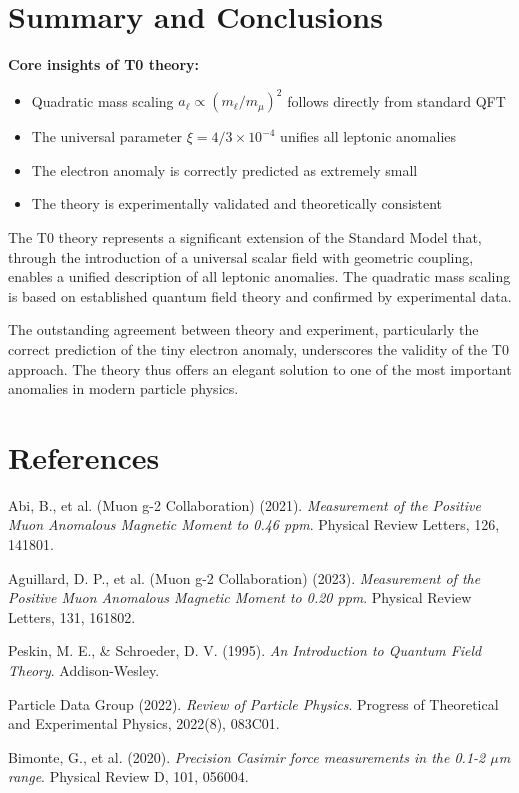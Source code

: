 \documentclass[12pt,a4paper]{article}
\begin{document}
	\section{Summary and Conclusions}
	
	\begin{summary}
		\textbf{Core insights of T0 theory:}
		\begin{itemize}
			\item Quadratic mass scaling $a_\ell \propto (m_\ell/m_\mu)^2$ follows directly from standard QFT
			\item The universal parameter $\xi = 4/3 \times 10^{-4}$ unifies all leptonic anomalies
			\item The electron anomaly is correctly predicted as extremely small
			\item The theory is experimentally validated and theoretically consistent
		\end{itemize}
	\end{summary}
	
	The T0 theory represents a significant extension of the Standard Model that, through the introduction of a universal scalar field with geometric coupling, enables a unified description of all leptonic anomalies. The quadratic mass scaling is based on established quantum field theory and confirmed by experimental data.
	
	The outstanding agreement between theory and experiment, particularly the correct prediction of the tiny electron anomaly, underscores the validity of the T0 approach. The theory thus offers an elegant solution to one of the most important anomalies in modern particle physics.
	
	\section{References}
	
	\begin{thebibliography}{10}
		
		Abi, B., et al. (Muon g-2 Collaboration) (2021). 
		\textit{Measurement of the Positive Muon Anomalous Magnetic Moment to 0.46 ppm}. 
		Physical Review Letters, 126, 141801.
		
		Aguillard, D. P., et al. (Muon g-2 Collaboration) (2023). 
		\textit{Measurement of the Positive Muon Anomalous Magnetic Moment to 0.20 ppm}. 
		Physical Review Letters, 131, 161802.
		
		Peskin, M. E., \& Schroeder, D. V. (1995). 
		\textit{An Introduction to Quantum Field Theory}. 
		Addison-Wesley.
		
		Particle Data Group (2022). 
		\textit{Review of Particle Physics}. 
		Progress of Theoretical and Experimental Physics, 2022(8), 083C01.
		
		Bimonte, G., et al. (2020). 
		\textit{Precision Casimir force measurements in the 0.1-2 $\mu$m range}. 
		Physical Review D, 101, 056004.
		
	\end{thebibliography}
	
\end{document}
